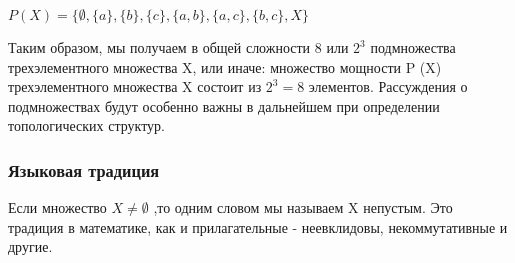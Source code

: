 \vspace{0.5cm}
\(P(X)=\{\emptyset, \{a\}, \{b\},\{c\},\{a,b\},\{a,c\},\{b,c\}, X\}\)

\vspace{0.5cm}

Таким образом, мы получаем в общей сложности 8 или \(2^3\) подмножества трехэлементного множества X, или иначе: множество мощности P (X) трехэлементного множества X состоит из \(2^3 = 8\) элементов. Рассуждения о подмножествах будут особенно важны в дальнейшем при определении топологических структур.

\subsubsection{Языковая традиция}
Если множество \(X \neq \emptyset\) ,то одним словом мы называем X непустым. Это традиция в математике, как и прилагательные - неевклидовы, некоммутативные и другие.

